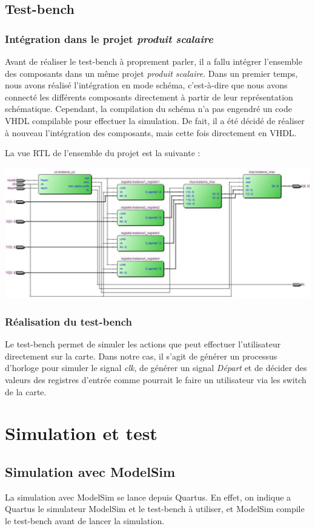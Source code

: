 \documentclass[a4paper]{report}
\begin{document}
\chapter{Test-bench}
\section{Intégration dans le projet \emph{produit scalaire}}
Avant de réaliser le test-bench à proprement parler, il a fallu intégrer l'ensemble des composants dans un même projet \emph{produit scalaire}.
Dans un premier temps, nous avons réalisé l'intégration en mode schéma, c'est-à-dire que nous avons connecté les différents composants directement à partir de leur représentation schématique.
Cependant, la compilation du schéma n'a pas engendré un code VHDL compilable pour effectuer la simulation.
De fait, il a été décidé de réaliser à nouveau l'intégration des composants, mais cette fois directement en VHDL.

La vue RTL de l'ensemble du projet est la suivante :
\begin{center}
	\includegraphics[scale=0.4]{produitscalaire1.jpg}
\end{center}

\section{Réalisation du test-bench}
Le test-bench permet de simuler les actions que peut effectuer l'utilisateur directement sur la carte.
Dans notre cas, il s'agit de générer un processus d'horloge pour simuler le signal \emph{clk}, de générer un signal \emph{Départ} et de décider des valeurs des registres d'entrée comme pourrait le faire un utilisateur via les switch de la carte.

\part{Simulation et test}
\chapter{Simulation avec ModelSim}
La simulation avec ModelSim se lance depuis Quartus. En effet, on indique a Quartus le simulateur ModelSim et le test-bench à utiliser, et ModelSim compile le test-bench avant de lancer la simulation.
\end{document}
